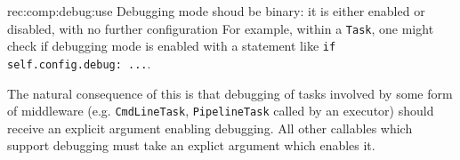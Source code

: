 \begin{recommendation}
    {rec:comp:debug:use}
    {Debugging mode shoud be binary: it is either enabled or disabled, with no further configuration}
    For example, within a \texttt{Task}, one might check if debugging mode is
    enabled with a statement like \texttt{if self.config.debug: ...}.
\end{recommendation}

The natural consequence of this is that debugging of tasks involved by some
form of middleware (e.g. \texttt{CmdLineTask}, \texttt{PipelineTask} called by
an executor) should receive an explicit argument enabling debugging. All other
callables which support debugging must take an explict argument which enables
it.
